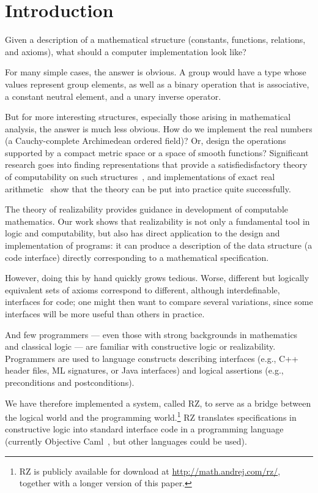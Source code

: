 \section{Introduction}
\label{sec:introduction}

Given a description of a mathematical structure (constants,
functions, relations, and axioms), what should a computer
implementation look like?

For many simple cases, the answer is obvious. A
group would have a type whose values represent group elements, as well
as a binary operation that is associative, a constant 
neutral element, and a unary inverse operator.

But for more interesting structures, especially those arising in
mathematical analysis, the answer is much less obvious. How do we
implement the real numbers (a Cauchy-complete Archimedean ordered
field)? Or, design the operations supported by a compact metric
space or a space of smooth functions? Significant research goes into
finding representations that provide a satisfiedisfactory theory of
computability on such structures~\cite{Wei00,TZ98,Bla97,EL00}, and
implementations of exact real arithmetic~\cite{Mue00,Lam05a} show that
the theory can be put into practice quite successfully.

The theory of realizability provides guidance in development of
computable mathematics.  Our work shows that realizability is
not only  a
fundamental tool in logic and computability, but also
has direct application to the design and implementation of programs:
it can produce a description of the data structure (a code interface)
directly corresponding to a mathematical specification.

However, doing this by hand quickly grows tedious. Worse, different
but logically equivalent sets of axioms correspond to different,
although interdefinable, interfaces for code; one might then want to
compare several variations, since some interfaces will be more useful
than others in practice.

And few programmers --- even those with strong backgrounds in
mathematics and classical logic --- are familiar with constructive logic or
realizability.  Programmers are used to language constructs
describing interfaces (e.g., C++ header files, ML signatures, or Java
interfaces) and logical assertions (e.g., preconditions
and postconditions).


We have therefore implemented a system, called RZ, to serve as a
bridge between the logical world and the programming world.\footnote{RZ
  is publicly available for download at
  \url{http://math.andrej.com/rz/}, together with a longer version of
  this paper.} RZ translates specifications in
constructive logic into standard interface code in a programming
language (currently Objective Caml~\cite{ocaml}, but other languages
could be used).

